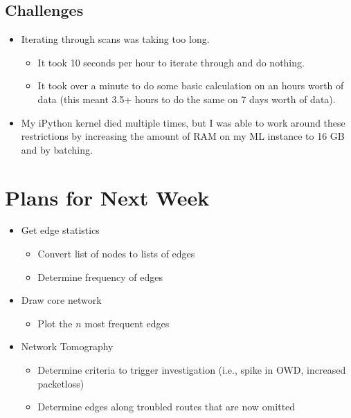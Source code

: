 \documentclass{weeklyreport}
\begin{document}
\subsection*{Challenges}

\begin{itemize}
    \item Iterating through scans was taking too long.
    \begin{itemize}
    	\item It took 10 seconds per hour to iterate through and do nothing.
    	\item It took over a minute to do some basic calculation on an hours worth of data (this meant 3.5+ hours to do the same on 7 days worth of data).
    \end{itemize}
    \item My iPython kernel died multiple times, but I was able to work around these restrictions by increasing the amount of RAM on my ML instance to 16 GB and by batching.
\end{itemize}

\section*{Plans for Next Week}

\begin{itemize}
	\item Get edge statistics
	\begin{itemize}
		\item Convert list of nodes to lists of edges
		\item Determine frequency of edges
	\end{itemize}
	\item Draw core network
	\begin{itemize}
		\item Plot the $n$ most frequent edges
	\end{itemize}
	\item Network Tomography
	\begin{itemize}
		\item Determine criteria to trigger investigation (i.e., spike in OWD, increased packetloss)
		\item Determine edges along troubled routes that are now omitted
	\end{itemize}
\end{itemize}
\end{document}
